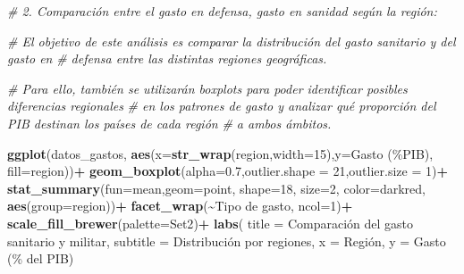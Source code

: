\documentclass[,article,,moreauthors,pdftex]{Definitions/mdpi}
\newenvironment{Shaded}{\begin{snugshade}}{\end{snugshade}}
\newcommand{\AttributeTok}[1]{\textcolor[rgb]{0.13,0.29,0.53}{#1}}
\newcommand{\CommentTok}[1]{\textcolor[rgb]{0.56,0.35,0.01}{\textit{#1}}}
\newcommand{\DecValTok}[1]{\textcolor[rgb]{0.00,0.00,0.81}{#1}}
\newcommand{\FloatTok}[1]{\textcolor[rgb]{0.00,0.00,0.81}{#1}}
\newcommand{\FunctionTok}[1]{\textcolor[rgb]{0.13,0.29,0.53}{\textbf{#1}}}
\newcommand{\NormalTok}[1]{#1}
\newcommand{\SpecialCharTok}[1]{\textcolor[rgb]{0.81,0.36,0.00}{\textbf{#1}}}
\newcommand{\StringTok}[1]{\textcolor[rgb]{0.31,0.60,0.02}{#1}}
\begin{document}
\begin{Shaded}
\begin{Highlighting}[]
\CommentTok{\# 2. Comparación entre el gasto en defensa, gasto en sanidad según la región:}

\CommentTok{\# El objetivo de este análisis es comparar la distribución del gasto sanitario y del gasto en}
\CommentTok{\# defensa entre las distintas regiones geográficas.}

\CommentTok{\# Para ello, también se utilizarán boxplots para poder identificar posibles diferencias regionales}
\CommentTok{\# en los patrones de gasto y analizar qué proporción del PIB destinan los países de cada región }
\CommentTok{\# a ambos ámbitos.}


\FunctionTok{ggplot}\NormalTok{(datos\_gastos, }\FunctionTok{aes}\NormalTok{(}\AttributeTok{x=}\FunctionTok{str\_wrap}\NormalTok{(region,}\AttributeTok{width=}\DecValTok{15}\NormalTok{),}\AttributeTok{y=}\StringTok{\textasciigrave{}}\AttributeTok{Gasto (\%PIB)}\StringTok{\textasciigrave{}}\NormalTok{, }\AttributeTok{fill=}\NormalTok{region))}\SpecialCharTok{+}
  \FunctionTok{geom\_boxplot}\NormalTok{(}\AttributeTok{alpha=}\FloatTok{0.7}\NormalTok{,}\AttributeTok{outlier.shape =} \DecValTok{21}\NormalTok{,}\AttributeTok{outlier.size =} \DecValTok{1}\NormalTok{)}\SpecialCharTok{+}
  \FunctionTok{stat\_summary}\NormalTok{(}\AttributeTok{fun=}\NormalTok{mean,}\AttributeTok{geom=}\StringTok{\textquotesingle{}point\textquotesingle{}}\NormalTok{, }\AttributeTok{shape=}\DecValTok{18}\NormalTok{, }\AttributeTok{size=}\DecValTok{2}\NormalTok{, }\AttributeTok{color=}\StringTok{\textquotesingle{}darkred\textquotesingle{}}\NormalTok{, }\FunctionTok{aes}\NormalTok{(}\AttributeTok{group=}\NormalTok{region))}\SpecialCharTok{+}
  \FunctionTok{facet\_wrap}\NormalTok{(}\SpecialCharTok{\textasciitilde{}}\StringTok{\textasciigrave{}}\AttributeTok{Tipo de gasto}\StringTok{\textasciigrave{}}\NormalTok{, }\AttributeTok{ncol=}\DecValTok{1}\NormalTok{)}\SpecialCharTok{+}
  \FunctionTok{scale\_fill\_brewer}\NormalTok{(}\AttributeTok{palette=}\StringTok{\textquotesingle{}Set2\textquotesingle{}}\NormalTok{)}\SpecialCharTok{+}
  \FunctionTok{labs}\NormalTok{(}
    \AttributeTok{title =} \StringTok{\textquotesingle{}Comparación del gasto sanitario y militar\textquotesingle{}}\NormalTok{,}
    \AttributeTok{subtitle =} \StringTok{\textquotesingle{}Distribución por regiones\textquotesingle{}}\NormalTok{,}
    \AttributeTok{x =} \StringTok{\textquotesingle{}Región\textquotesingle{}}\NormalTok{,}
    \AttributeTok{y =} \StringTok{\textquotesingle{}Gasto (\% del PIB)\textquotesingle{}}

\end{Highlighting}
\end{Shaded}
\end{document}
